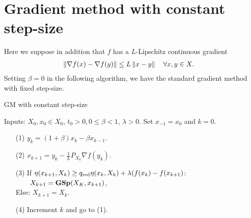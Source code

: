 \documentclass[12pt,english]{article}
\newcommand{\GS}{\mbox{\boldmath\textbf{GSp}}}
\begin{document}
\section{Gradient method with constant step-size}\label{sec:}
%
Here we suppose in addition that $f$ has a $L$-Lipschitz continuous gradient
%
\begin{align*}
\left\|\nabla f(x)-\nabla f(y)\right\| \le L \left\|x-y\right\|\quad \forall x,y\in X.
\end{align*}
%
Setting $\beta=0$ in the following algorithm, we have the standard gradient method with fixed step-size.
%
\begin{yellow}
\begin{algorithm}[H]
\caption{GM with constant step-size} 
\label{algorithm:Descent} 
%
Inputs: $X_0, x_0\in X_0$, $t_0>0, 0\le\beta<1$, $\lambda>0$. Set $x_{-1}=x_0$ and $k=0$.
%
\begin{itemize}
\item[(1)] $y_{k} = (1+\beta)x_k - \beta x_{k-1}$.
\item[(2)] $x_{k+1} = y_k - \frac{1}{L}P_{X_k}\nabla f(y_k)$.
\item[(3)] If $\eta(x_{k+1},X_k) \ge q_{\rm red} \eta(x_{k},X_k) + \lambda(f(x_k)-f(x_{k+1})$:\\ 
$\qquad X_{k+1} = \GS(X_K, x_{k+1})$,\\
Else: $X_{k+1} = X_k$.
\item[(4)] Increment $k$ and go to (1).
\end{itemize}
%
\end{algorithm}
\end{yellow}
\end{document}
